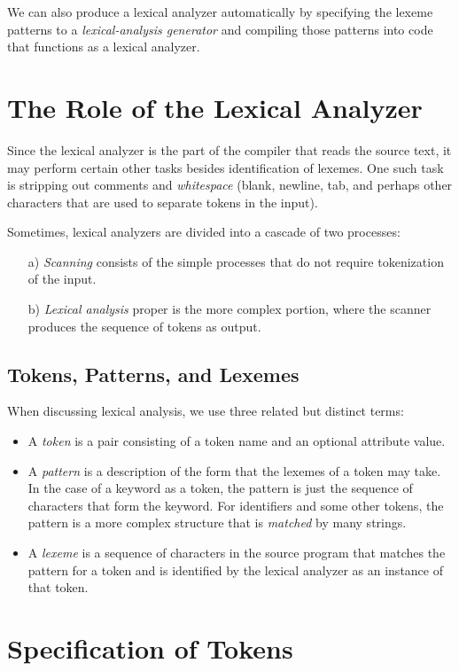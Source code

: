 \documentclass[12pt,a4paper,twoside,openany]{book}
\begin{document}
We can also produce a lexical analyzer automatically by specifying the lexeme patterns to a \textit{lexical-analysis generator} and compiling those patterns into code that functions as a lexical analyzer.

\section{The Role of the Lexical Analyzer}

Since the lexical analyzer is the part of the compiler that reads the source text, it may perform certain other tasks besides identification of lexemes. One such task is stripping out comments and \textit{whitespace} (blank, newline, tab, and perhaps other characters that are used to separate tokens in the input).

Sometimes, lexical analyzers are divided into a cascade of two processes:
\begin{itemize}
    \item[a)]\textit{Scanning} consists of the simple processes that do not require tokenization of the input.
    \item[b)]\textit{Lexical analysis} proper is the more complex portion, where the scanner produces the sequence of tokens as output.
\end{itemize}

\subsection{Tokens, Patterns, and Lexemes}

When discussing lexical analysis, we use three related but distinct terms:
\begin{itemize}
    \item A \textit{token} is a pair consisting of a token name and an optional attribute value.
    \item A \textit{pattern} is a description of the form that the lexemes of a token may take. In the case of a keyword as a token, the pattern is just the sequence of characters that form the keyword. For identifiers and some other tokens, the pattern is a more complex structure that is \textit{matched} by many strings.
    \item A \textit{lexeme}  is a sequence of characters in the source program that matches the pattern for a token and is identified by the lexical analyzer as an instance of that token.
\end{itemize}

\section{Specification of Tokens}
\end{document}
